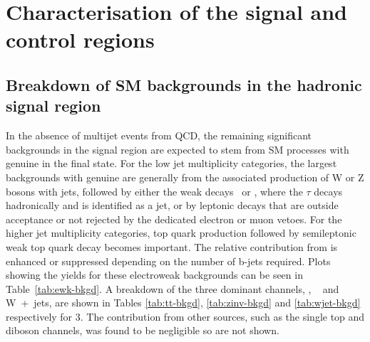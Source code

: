 \section{Characterisation of the signal and control regions}
\label{sec:yields}

%

\subsection{Breakdown of SM backgrounds in the hadronic signal
  region\label{sec:bkgd-comp}}

In the absence of multijet events from QCD, the remaining significant
backgrounds in the signal region are expected to stem from SM
processes with genuine \met in the final state. For the low jet
multiplicity categories, the largest backgrounds with genuine \met are
generally from the associated production of W or Z bosons with jets,
followed by either the weak decays \znunu\ or \wtaunu, where the
$\tau$ decays hadronically and is identified as a jet, or by leptonic
decays that are outside acceptance or not rejected by the dedicated
electron or muon vetoes. For the higher jet multiplicity categories,
top quark production followed by semileptonic weak top quark decay
becomes important. The relative contribution from \ttbar is enhanced
or suppressed depending on the number of b-jets required. 
Plots showing the yields for these electroweak backgrounds can be seen in Table~\ref{tab:ewk-bkgd}.
A breakdown of the three
dominant channels, \ttbar, \zInv~ and W~+~jets, are shown in Tables \ref{tab:tt-bkgd}, 
\ref{tab:zinv-bkgd} and \ref{tab:wjet-bkgd} respectively for 3\ifb. The contribution from
other sources, such as the single top and diboson channels, was found to be
negligible so are not shown.

